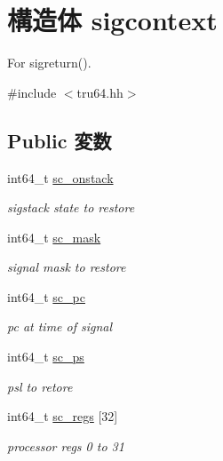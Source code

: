 \hypertarget{structTru64_1_1sigcontext}{
\section{構造体 sigcontext}
\label{structTru64_1_1sigcontext}
}


For sigreturn().  


{\ttfamily \#include $<$tru64.hh$>$}\subsection*{Public 変数}
\begin{DoxyCompactItemize}
\item 
int64\_\-t \hyperlink{structTru64_1_1sigcontext_aac6248d3fc6622d1eba5e745eead2afe}{sc\_\-onstack}
\begin{DoxyCompactList}\small\item\em sigstack state to restore \item\end{DoxyCompactList}\item 
int64\_\-t \hyperlink{structTru64_1_1sigcontext_aca41ac798f6ea09747ad6eea4fc2d619}{sc\_\-mask}
\begin{DoxyCompactList}\small\item\em signal mask to restore \item\end{DoxyCompactList}\item 
int64\_\-t \hyperlink{structTru64_1_1sigcontext_a90105ddd3817a2c44be1bb1f0bd30d82}{sc\_\-pc}
\begin{DoxyCompactList}\small\item\em pc at time of signal \item\end{DoxyCompactList}\item 
int64\_\-t \hyperlink{structTru64_1_1sigcontext_adde30abb98da1164049bf0ddc578f0ae}{sc\_\-ps}
\begin{DoxyCompactList}\small\item\em psl to retore \item\end{DoxyCompactList}\item 
int64\_\-t \hyperlink{structTru64_1_1sigcontext_af70718846f00ef020466ed0cc32face6}{sc\_\-regs} \mbox{[}32\mbox{]}
\begin{DoxyCompactList}\small\item\em processor regs 0 to 31 \item\end{DoxyCompactList}\item 

\end{DoxyCompactItemize}
